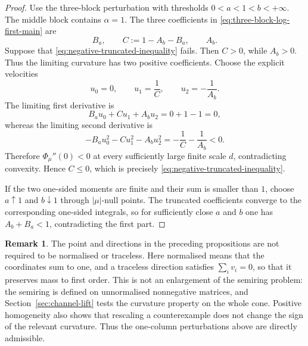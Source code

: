 \documentclass[aps,pra,11pt,onecolumn,nofootinbib,tightenlines]{revtex4-2}
\theoremstyle{definition}
\newtheorem{remark}[theorem]{Remark}
\begin{document}
\begin{proof}
Use the three-block perturbation with thresholds
$0<a<1<b<+\infty$. The middle block contains $\alpha=1$. The three
coefficients in \eqref{eq:three-block-log-first-main} are
\begin{equation}
 B_a,
 \qquad
 C:=1-A_b-B_a,
 \qquad
 A_b.
 \label{eq:negative-three-coefficients}
\end{equation}
Suppose that \eqref{eq:negative-truncated-inequality} fails. Then $C>0$, while $A_b>0$. Thus the limiting curvature has two positive coefficients. Choose the explicit velocities
\begin{equation}
 u_0=0,
 \qquad
 u_1=\frac1C,
 \qquad
 u_2=-\frac1{A_b}.
 \label{eq:negative-truncated-velocities}
\end{equation}
The limiting first derivative is
\begin{equation}
 B_au_0+Cu_1+A_bu_2
 =0+1-1=0,
 \label{eq:negative-truncated-first-zero}
\end{equation}
whereas the limiting second derivative is
\begin{equation}
 -B_au_0^2-Cu_1^2-A_bu_2^2
 =-\frac1C-\frac1{A_b}<0.
 \label{eq:negative-truncated-second-negative}
\end{equation}
Therefore $\Phi_\mu''(0)<0$ at every sufficiently large finite scale $d$, contradicting convexity. Hence $C\leq0$, which is precisely \eqref{eq:negative-truncated-inequality}.

If the two one-sided moments are finite and their sum is smaller than $1$, choose $a\uparrow1$ and $b\downarrow1$ through $|\mu|$-null points. The truncated coefficients converge to the corresponding one-sided integrals, so for sufficiently close $a$ and $b$ one has $A_b+B_a<1$, contradicting the first part.
\end{proof}

\begin{remark}
\label{rem:normalizing-witnesses}
The point and directions in the preceding propositions are not required to be normalised or traceless. Here normalised means that the coordinates sum to one, and a traceless direction satisfies $\sum_i v_i=0$, so that it preserves mass to first order. This is not an enlargement of the semiring problem: the semiring is defined on unnormalised nonnegative matrices, and Section~\ref{sec:channel-lift} tests the curvature property on the whole cone. Positive homogeneity also shows that rescaling a counterexample does not change the sign of the relevant curvature. Thus the one-column perturbations above are directly admissible.
\end{remark}
\end{document}
